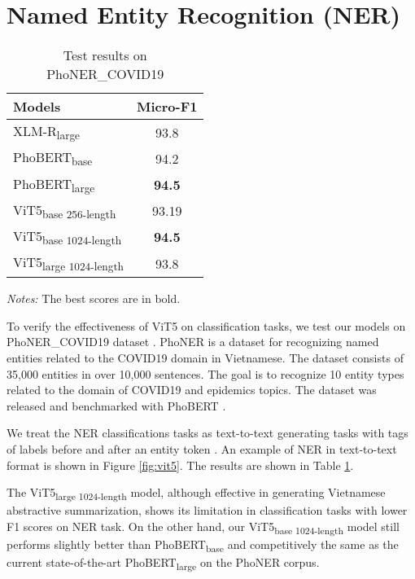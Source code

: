 \documentclass[11pt,a4paper]{article}
\begin{document}
\section{Named Entity Recognition (NER)}
\begin{table}[H]
\centering
\caption{Test results on PhoNER\_COVID19}
\begin{threeparttable}

\begin{tabular}{p{4.5cm}|c}
\hline
Models             & Micro-F1      \\ \hline
XLM-R\textsubscript{large}       & 93.8          \\
PhoBERT\textsubscript{base}      & 94.2          \\
PhoBERT\textsubscript{large}      & \textbf{94.5}          \\
ViT5\textsubscript{base 256-length}  &      93.19         \\
ViT5\textsubscript{base 1024-length} & \textbf{94.5} \\
ViT5\textsubscript{large 1024-length} & 93.8 \\ \hline
\end{tabular}


\begin{tablenotes}
      \small
      \item \textit{Notes:} The best scores are in bold.
\end{tablenotes}
\end{threeparttable}
\label{phoner_result}

\end{table}


%
 To verify the effectiveness of ViT5 on classification tasks, we test our models on PhoNER\_COVID19 dataset \cite{PhoNER_COVID19}. PhoNER is a dataset for recognizing named entities related to the COVID19 domain in Vietnamese. The dataset consists of 35,000 entities in over 10,000 sentences. The goal is to recognize 10 entity types related to the domain of COVID19 and epidemics topics. The dataset was released and benchmarked with PhoBERT \cite{phobert}. 

We treat the NER classifications tasks as text-to-text generating tasks with tags of labels before and after an entity token \cite{scifive}. An example of NER in text-to-text format is shown in Figure \ref{fig:vit5}. The results are shown in Table \ref{phoner_result}.

The ViT5\textsubscript{large 1024-length} model, although effective in generating Vietnamese abstractive summarization, shows its limitation in classification tasks with lower F1 scores on NER task. On the other hand, our ViT5\textsubscript{base 1024-length} model still performs slightly better than PhoBERT\textsubscript{base} and competitively the same as the current state-of-the-art PhoBERT\textsubscript{large} on the PhoNER corpus. 
\end{document}
